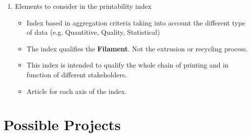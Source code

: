\begin{enumerate}[noitemsep]
	\item Elements to consider in the printability index
		\begin{itemize}
			\item Index based in aggregation criteria taking into account the different type of data (e.g. Quantitive, Quality, Statistical)
			\item The index qualifies the \textbf{Filament}. Not the extrusion or recycling process.
			\item This index is intended to qualify the whole chain of printing and in function of different stakeholders.
			\item Article for each axis of the index.

		\end{itemize}
\end{enumerate}


\section*{Possible Projects}

